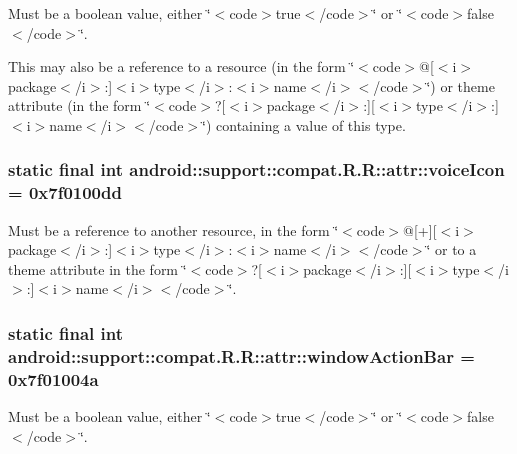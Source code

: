 Must be a boolean value, either \char`\"{}$<$code$>$true$<$/code$>$\char`\"{} or \char`\"{}$<$code$>$false$<$/code$>$\char`\"{}. 

This may also be a reference to a resource (in the form \char`\"{}$<$code$>$@\mbox{[}$<$i$>$package$<$/i$>$:\mbox{]}$<$i$>$type$<$/i$>$:$<$i$>$name$<$/i$>$$<$/code$>$\char`\"{}) or theme attribute (in the form \char`\"{}$<$code$>$?\mbox{[}$<$i$>$package$<$/i$>$:\mbox{]}\mbox{[}$<$i$>$type$<$/i$>$:\mbox{]}$<$i$>$name$<$/i$>$$<$/code$>$\char`\"{}) containing a value of this type. \hypertarget{classandroid_1_1support_1_1compat_1_1_r_1_1attr_3d11d27a2f1a8864a0beb728e3abb6e5}{
\subsubsection[{voiceIcon}]{\setlength{\rightskip}{0pt plus 5cm}static final int android::support::compat.R.R::attr::voiceIcon = 0x7f0100dd}}
\label{classandroid_1_1support_1_1compat_1_1_r_1_1attr_3d11d27a2f1a8864a0beb728e3abb6e5}


Must be a reference to another resource, in the form \char`\"{}$<$code$>$@\mbox{[}+\mbox{]}\mbox{[}$<$i$>$package$<$/i$>$:\mbox{]}$<$i$>$type$<$/i$>$:$<$i$>$name$<$/i$>$$<$/code$>$\char`\"{} or to a theme attribute in the form \char`\"{}$<$code$>$?\mbox{[}$<$i$>$package$<$/i$>$:\mbox{]}\mbox{[}$<$i$>$type$<$/i$>$:\mbox{]}$<$i$>$name$<$/i$>$$<$/code$>$\char`\"{}. \hypertarget{classandroid_1_1support_1_1compat_1_1_r_1_1attr_f0ce48b11023ab5740258b11d1fb37d6}{
\subsubsection[{windowActionBar}]{\setlength{\rightskip}{0pt plus 5cm}static final int android::support::compat.R.R::attr::windowActionBar = 0x7f01004a}}
\label{classandroid_1_1support_1_1compat_1_1_r_1_1attr_f0ce48b11023ab5740258b11d1fb37d6}


Must be a boolean value, either \char`\"{}$<$code$>$true$<$/code$>$\char`\"{} or \char`\"{}$<$code$>$false$<$/code$>$\char`\"{}. 

